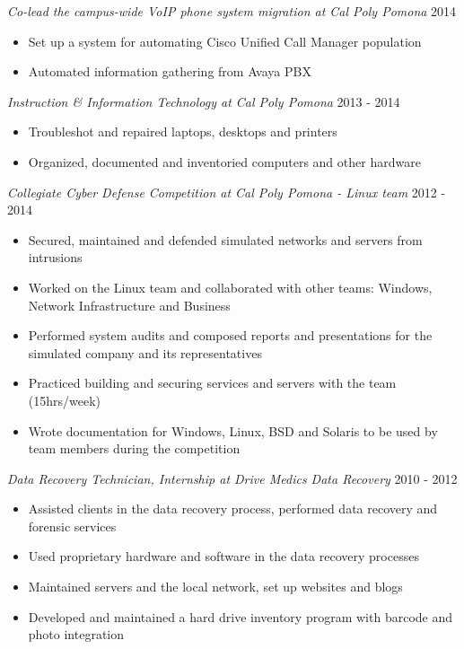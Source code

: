 \documentclass[line]{tex/res}
\begin{document}
\begin{resume}
    \vspace{0.1in} %

	{\sl Co-lead the campus-wide VoIP phone system migration at Cal Poly Pomona} \hfill 2014
	\begin{itemize} \itemsep -2pt
		\item Set up a system for automating Cisco Unified Call Manager population
		\item Automated information gathering from Avaya PBX
	\end{itemize}

	{\sl Instruction \& Information Technology at Cal Poly Pomona} \hfill 2013 - 2014
	\begin{itemize} \itemsep -2pt
		\item Troubleshot and repaired laptops, desktops and printers
		\item Organized, documented and inventoried computers and other hardware
	\end{itemize}

    {\sl Collegiate Cyber Defense Competition at Cal Poly Pomona - Linux team} \hfill 2012 - 2014
	\begin{itemize} \itemsep -2pt
		\item Secured, maintained and defended simulated networks and servers from intrusions
		\item Worked on the Linux team and collaborated with other teams: Windows, Network Infrastructure and Business
		\item Performed system audits and composed reports and presentations for the simulated company and its representatives
		\item Practiced building and securing services and servers with the team (15hrs/week)
		\item Wrote documentation for Windows, Linux, BSD and Solaris to be used by team members during the competition
	\end{itemize}

	{\sl Data Recovery Technician, Internship at Drive Medics Data Recovery} \hfill 2010 - 2012
	\begin{itemize} \itemsep -2pt
		\item Assisted clients in the data recovery process, performed data recovery and forensic services
		\item Used proprietary hardware and software in the data recovery processes
		\item Maintained servers and the local network, set up websites and blogs
		\item Developed and maintained a hard drive inventory program with barcode and photo integration
	\end{itemize}


\end{resume}
\end{document}
